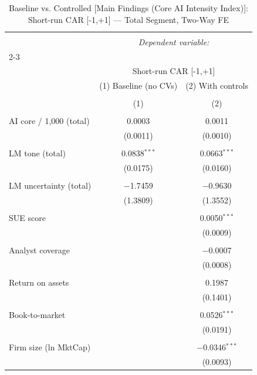 
\begin{table}[!htbp] \centering 
  \caption{Baseline vs. Controlled [Main Findings (Core AI Intensity Index)]: Short-run CAR [-1,+1] — Total Segment, Two-Way FE} 
  \label{} 
\begin{tabular}{@{\extracolsep{5pt}}lcc} 
\\[-1.8ex]\hline 
\hline \\[-1.8ex] 
 & \multicolumn{2}{c}{\textit{Dependent variable:}} \\ 
\cline{2-3} 
\\[-1.8ex] & \multicolumn{2}{c}{Short-run CAR [-1,+1]} \\ 
 & (1) Baseline (no CVs) & (2) With controls \\ 
\\[-1.8ex] & (1) & (2)\\ 
\hline \\[-1.8ex] 
 AI core / 1,000 (total) & 0.0003 & 0.0011 \\ 
  & (0.0011) & (0.0010) \\ 
  & & \\ 
 LM tone (total) & 0.0838$^{***}$ & 0.0663$^{***}$ \\ 
  & (0.0175) & (0.0160) \\ 
  & & \\ 
 LM uncertainty (total) & $-$1.7459 & $-$0.9630 \\ 
  & (1.3809) & (1.3552) \\ 
  & & \\ 
 SUE score &  & 0.0050$^{***}$ \\ 
  &  & (0.0009) \\ 
  & & \\ 
 Analyst coverage &  & $-$0.0007 \\ 
  &  & (0.0008) \\ 
  & & \\ 
 Return on assets &  & 0.1987 \\ 
  &  & (0.1401) \\ 
  & & \\ 
 Book-to-market &  & 0.0526$^{***}$ \\ 
  &  & (0.0191) \\ 
  & & \\ 
 Firm size (ln MktCap) &  & $-$0.0346$^{***}$ \\ 
  &  & (0.0093) \\ 

\end{tabular}
\end{table}
